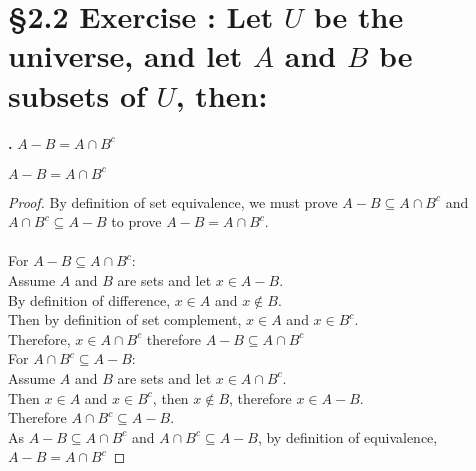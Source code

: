 \documentclass[a4paper,11pt]{article}
\begin{document}
\section*{\S 2.2 Exercise : Let \(U\) be the universe, and let \(A\) and \(B\) be subsets of \(U\), then: }
\textbf{.}
\(A - B = A \cap B^c\)
\begin{theorem5}
\(A - B = A \cap B^c\)
\begin{proof}
By definition of set equivalence, we must prove \(A - B \subseteq A \cap B^c\) 
and \(A \cap B^c \subseteq A - B\) to prove \(A - B = A \cap B^c\).\\\\
For \(A - B \subseteq A \cap B^c:\)\\
Assume \(A\) and \(B\) are sets and let \(x \in A - B\).\\
By definition of difference, \(x \in A\) and \(x \notin B\).\\
Then by definition of set complement, \(x \in A\) and \(x \in B^c\).\\ 
Therefore, \(x \in A \cap B^c\) therefore \(A - B \subseteq A \cap B^c\)\\

\noindent For \(A \cap B^c \subseteq A - B\):\\
Assume \(A\) and \(B\) are sets and let \(x \in A \cap B^c\).\\
Then \(x \in A\) and \(x \in B^c\), then \(x \notin B\), therefore \(x \in A - B\).\\
Therefore \(A \cap B^c \subseteq A - B\).\\

\noindent As \(A - B \subseteq A \cap B^c\) and \(A \cap B^c \subseteq A - B\), by 
definition of equivalence, \(A - B = A \cap B^c\)
\end{proof}
\end{theorem5}

\newpage

\setcounter{ProblemCounter}{8}
\setcounter{SubsectionCounter}{7}
\end{document}
